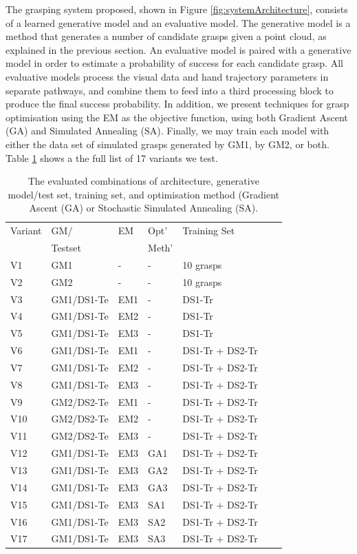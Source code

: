 \noindent
The grasping system proposed, shown in Figure \ref{fig:systemArchitecture}, consists of a learned generative model and an evaluative model. The generative model is a method that generates a number of candidate grasps given a point cloud, as explained in the previous section. An evaluative model is paired with a generative model in order to estimate a probability of success for each candidate grasp. All evaluative models process the visual data and hand trajectory parameters in separate pathways, and combine them to feed into a third processing block to produce the final success probability. In addition, we present techniques for grasp optimisation using the EM as the objective function, using both Gradient Ascent (GA) and Simulated Annealing (SA). Finally, we may train each model with either the data set of simulated grasps generated by GM1, by GM2, or both. Table \ref{table:GEBreakdown} shows a the full list of 17 variants we test.

\begin{table}[b]
\footnotesize
\centering
\begin{tabular}{|l|l|l|l|l|l|l|}
\hline
Variant & GM/  & EM & Opt'  & Training Set \\ 
 & Testset & & Meth' & \\ \hline
V1 & GM1    & - & - & 10 grasps  \\ \hline
V2 & GM2    & - & - & 10 grasps  \\ \hline
V3 & GM1/DS1-Te & EM1 & - & DS1-Tr \\ \hline
V4 & GM1/DS1-Te & EM2 & - & DS1-Tr \\ \hline
V5 & GM1/DS1-Te & EM3 & - & DS1-Tr  \\ \hline
V6 & GM1/DS1-Te & EM1 & - & DS1-Tr + DS2-Tr \\ \hline
V7 & GM1/DS1-Te & EM2 & - & DS1-Tr + DS2-Tr \\ \hline
V8 & GM1/DS1-Te & EM3 & - & DS1-Tr + DS2-Tr \\ \hline
V9 & GM2/DS2-Te & EM1 & - & DS1-Tr + DS2-Tr \\ \hline
V10 & GM2/DS2-Te & EM2 & - & DS1-Tr + DS2-Tr \\ \hline
V11 & GM2/DS2-Te & EM3 & - & DS1-Tr + DS2-Tr \\ \hline
V12 & GM1/DS1-Te & EM3 & GA1 & DS1-Tr + DS2-Tr \\ \hline
V13 & GM1/DS1-Te & EM3 & GA2 & DS1-Tr + DS2-Tr \\ \hline
V14 & GM1/DS1-Te & EM3 & GA3 & DS1-Tr + DS2-Tr \\ \hline
V15 & GM1/DS1-Te & EM3 & SA1 & DS1-Tr + DS2-Tr \\ \hline
V16 & GM1/DS1-Te & EM3 & SA2 & DS1-Tr + DS2-Tr \\ \hline
V17 & GM1/DS1-Te & EM3 & SA3 & DS1-Tr + DS2-Tr \\ \hline
\end{tabular}
\caption{The evaluated combinations of architecture, generative model/test set, training set, and optimisation method (Gradient Ascent (GA) or Stochastic Simulated Annealing (SA).}
\label{table:GEBreakdown}
\end{table}

